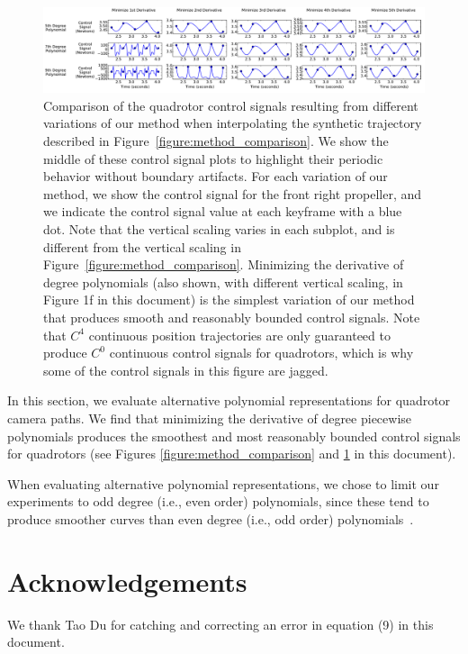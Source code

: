 \begin{figure}[th!]
  \centering
  \includegraphics[width=7.0in]{images/2015_siggraph_asia_supplementary/parameter_comparison}
  \caption{
Comparison of the quadrotor control signals resulting from different variations of our method when interpolating the synthetic trajectory described in Figure~\ref{figure:method_comparison}.
We show the middle of these control signal plots to highlight their periodic behavior without boundary artifacts.
For each variation of our method, we show the control signal for the front right propeller, and we indicate the control signal value at each keyframe with a blue dot. Note that the vertical scaling varies in each subplot, and is different from the vertical scaling in Figure~\ref{figure:method_comparison}.
Minimizing the  derivative of  degree polynomials (also shown, with different vertical scaling, in Figure 1f in this document) is the simplest variation of our method that produces smooth and reasonably bounded control signals.
Note that  $C^4$ continuous position trajectories are only guaranteed to produce $C^0$ continuous control signals for quadrotors, which is why some of the control signals in this figure are jagged.
}
  \label{figure:parameter_comparison}
\end{figure}

In this section, we evaluate alternative polynomial representations for quadrotor camera paths.
We find that minimizing the  derivative of  degree piecewise polynomials produces the smoothest and most reasonably bounded control signals for quadrotors (see Figures \ref{figure:method_comparison} and \ref{figure:parameter_comparison} in this document).

When evaluating alternative polynomial representations, we chose to limit our experiments to odd degree (i.e., even order) polynomials, since these tend to produce smoother curves than even degree (i.e., odd order) polynomials~\cite{goshtasby:1990}.

\section*{Acknowledgements}

We thank Tao Du for catching and correcting an error in equation (9) in this document.

% 
% 

% 


